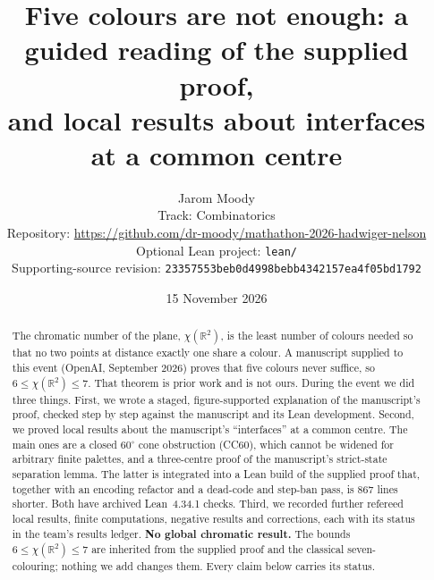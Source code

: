 \documentclass[11pt]{article}
\title{Five colours are not enough: a guided reading of the supplied proof,\\
and local results about interfaces at a common centre}
\author{Jarom Moody\\
Track: Combinatorics\\
Repository: \url{https://github.com/dr-moody/mathathon-2026-hadwiger-nelson}\\
Optional Lean project: \texttt{lean/}\\
Supporting-source revision: \texttt{23357553beb0d4998bebb4342157ea4f05bd1792}}
\date{15 November 2026}
\theoremstyle{definition}
\theoremstyle{remark}
\newcommand{\R}{\mathbb{R}}
\begin{document}
\sloppy
\maketitle

\begin{abstract}
The chromatic number of the plane, $\chi(\R^2)$, is the least number of colours needed so that no two points at distance exactly one share a colour. A manuscript supplied to this event (OpenAI, September 2026) proves that five colours never suffice, so $6\le\chi(\R^2)\le7$. That theorem is prior work and is not ours. During the event we did three things. First, we wrote a staged, figure-supported explanation of the manuscript's proof, checked step by step against the manuscript and its Lean development. Second, we proved local results about the manuscript's ``interfaces'' at a common centre. The main ones are a closed $60^\circ$ cone obstruction (CC60), which cannot be widened for arbitrary finite palettes, and a three-centre proof of the manuscript's strict-state separation lemma. The latter is integrated into a Lean build of the supplied proof that, together with an encoding refactor and a dead-code and step-ban pass, is 867 lines shorter. Both have archived Lean~4.34.1 checks. Third, we recorded further refereed local results, finite computations, negative results and corrections, each with its status in the team's results ledger. \textbf{No global chromatic result.} The bounds $6\le\chi(\R^2)\le7$ are inherited from the supplied proof and the classical seven-colouring; nothing we add changes them. Every claim below carries its status.
\end{abstract}
\end{document}

